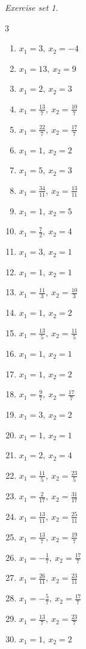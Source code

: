 \par\noindent\emph{Exercise set 1.}\nopagebreak
\begin{multicols}{3}\raggedright
\begin{enumerate}[label=\arabic*., leftmargin=*, itemsep=1pt]
\item $x_1=3,\ x_2=-4$
\item $x_1=13,\ x_2=9$
\item $x_1=2,\ x_2=3$
\item $x_1=\frac{13}{7},\ x_2=\frac{10}{7}$
\item $x_1=\frac{22}{7},\ x_2=\frac{17}{7}$
\item $x_1=1,\ x_2=2$
\item $x_1=5,\ x_2=3$
\item $x_1=\frac{34}{11},\ x_2=\frac{13}{11}$
\item $x_1=1,\ x_2=5$
\item $x_1=\frac{7}{2},\ x_2=4$
\item $x_1=3,\ x_2=1$
\item $x_1=1,\ x_2=1$
\item $x_1=\frac{11}{3},\ x_2=\frac{10}{3}$
\item $x_1=1,\ x_2=2$
\item $x_1=\frac{13}{5},\ x_2=\frac{11}{5}$
\item $x_1=1,\ x_2=1$
\item $x_1=1,\ x_2=2$
\item $x_1=\frac{9}{7},\ x_2=\frac{17}{7}$
\item $x_1=3,\ x_2=2$
\item $x_1=1,\ x_2=1$
\item $x_1=2,\ x_2=4$
\item $x_1=\frac{11}{5},\ x_2=\frac{23}{5}$
\item $x_1=\frac{2}{17},\ x_2=\frac{31}{17}$
\item $x_1=\frac{13}{11},\ x_2=\frac{25}{11}$
\item $x_1=\frac{13}{7},\ x_2=\frac{19}{7}$
\item $x_1=-\frac{1}{7},\ x_2=\frac{17}{7}$
\item $x_1=\frac{26}{11},\ x_2=\frac{23}{11}$
\item $x_1=-\frac{5}{7},\ x_2=\frac{17}{7}$
\item $x_1=\frac{13}{7},\ x_2=\frac{23}{7}$
\item $x_1=1,\ x_2=2$
\end{enumerate}
\end{multicols}

